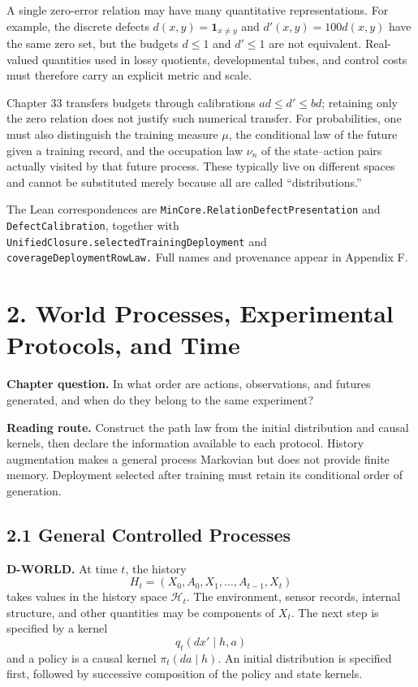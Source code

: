 \documentclass[
  english,
  11pt,
  oneside]{book}
\begin{document}
A single zero-error relation may have many quantitative representations. For example, the discrete defects \(d(x,y)=\mathbf1_{x\ne y}\) and \(d'(x,y)=100d(x,y)\) have the same zero set, but the budgets \(d\le1\) and \(d'\le1\) are not equivalent. Real-valued quantities used in lossy quotients, developmental tubes, and control costs must therefore carry an explicit metric and scale.

Chapter 33 transfers budgets through calibrations \(a d\le d'\le b d\); retaining only the zero relation does not justify such numerical transfer. For probabilities, one must also distinguish the training measure \(\mu\), the conditional law of the future given a training record, and the occupation law \(\nu_n\) of the state--action pairs actually visited by that future process. These typically live on different spaces and cannot be substituted merely because all are called ``distributions.''

The Lean correspondences are \nolinkurl{MinCore.RelationDefectPresentation} and \nolinkurl{DefectCalibration}, together with \nolinkurl{UnifiedClosure.selectedTrainingDeployment} and \nolinkurl{coverageDeploymentRowLaw.} Full names and provenance appear in Appendix F.

\chapter{2. World Processes, Experimental Protocols, and Time}\label{ch-2}

\textbf{Chapter question.} In what order are actions, observations, and futures generated, and when do they belong to the same experiment?

\textbf{Reading route.} Construct the path law from the initial distribution and causal kernels, then declare the information available to each protocol. History augmentation makes a general process Markovian but does not provide finite memory. Deployment selected after training must retain its conditional order of generation.

\section{2.1 General Controlled Processes}\label{general-controlled-processes}

\textbf{D-WORLD.} At time \(t\), the history \[H_t=(X_0,A_0,X_1,\ldots,A_{t-1},X_t)\] takes values in the history space \(\mathcal H_t\). The environment, sensor records, internal structure, and other quantities may be components of \(X_t\). The next step is specified by a kernel \[q_t(dx'\mid h,a)\] and a policy is a causal kernel \(\pi_t(da\mid h)\). An initial distribution is specified first, followed by successive composition of the policy and state kernels.
\end{document}
